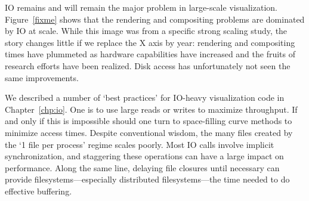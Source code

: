 




IO remains and will remain the major problem in large-scale
visualization.  Figure~\ref{fixme} shows that the rendering and
compositing problems are dominated by IO at scale.  While this image
was from a specific strong scaling study, the story changes little if
we replace the X axis by year: rendering and compositing times have
plummeted as hardware capabilities have increased and the fruits of
research efforts have been realized.  Disk access has unfortunately not
seen the same improvements.

We described a number of `best practices' for IO-heavy visualization
code in Chapter~\ref{chp:io}.  One is to use large reads or writes to
maximize throughput.  If and only if this is impossible should one
turn to space-filling curve methods to minimize access times.  Despite
conventional wisdom, the many files created by the `1 file per process'
regime scales poorly.  Most IO calls involve implicit synchronization,
and staggering these operations can have a large impact on performance.
Along the same line, delaying file closures until necessary can provide
filesystems---especially distributed filesystems---the time needed to
do effective buffering.

